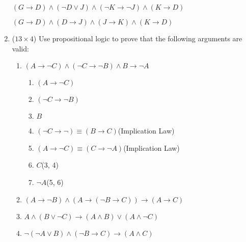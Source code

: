 \documentclass[12pt]{article}
\begin{document}
\begin{enumerate}
$(G \to D) \land (\lnot D \lor J) \land (\lnot K \to \lnot J) \land (K \to D)$

$(G \to D) \land (D \to J) \land (J \to K) \land (K \to D)$

\clearpage

\item ($13 \times 4$)
Use propositional logic to prove that the following arguments are valid:

\begin{enumerate}

\item
$(A \to \lnot C) \land (\lnot C \to \lnot B) \land B \to \lnot A$
\begin{enumerate}
	\item $(A \to \lnot C)$
	\item $(\lnot C \to \lnot B)$
	\item $B$
	\item $(\lnot C \to \lnot) \equiv (B \to C)$\hfill(Implication Law)
	\item $(A \to \lnot C) \equiv (C \to \lnot A)$\hfill(Implication Law)
	\item $C$\hfill(3, 4)
	\item $\lnot A$\hfill(5, 6)
\end{enumerate}


\clearpage
\item
$(A \to \lnot B) \land (A \to (\lnot B \to C)) \to (A \to C)$


\clearpage
\item
$A \land (B \lor \lnot C) \to (A \land B) \lor (A \land \lnot C)$


\clearpage
\item
$\lnot (\lnot A \lor B) \land (\lnot B \to C) \to (A \land C)$


\clearpage

\end{enumerate}

\end{enumerate}
\end{document}
